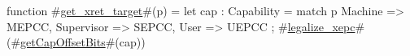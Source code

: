 function #\hyperref[sailRISCVzgetzyxretzytarget]{get\_xret\_target}#(p) = {
  let cap : Capability = match p {
    Machine    => MEPCC,
    Supervisor => SEPCC,
    User       => UEPCC
  };
  #\hyperref[sailRISCVzlegalizzezyxepc]{legalize\_xepc}#(#\hyperref[sailRISCVzgetCapOffsetBits]{getCapOffsetBits}#(cap))
}
